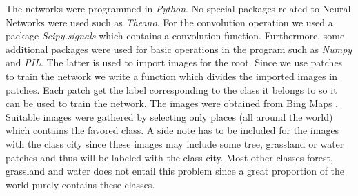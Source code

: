 \documentclass[a4paper,onecolumn]{report}
\begin{document}
The networks were programmed in \textit{Python}. No special packages related to Neural Networks were used such as \textit{Theano}. For the convolution operation we used a package \textit{Scipy.signals} which contains a convolution function. Furthermore, some additional packages were used for basic operations in the program such as \textit{Numpy} and \textit{PIL}. The latter is used to import images for the root. Since we use patches to train the network we write a function which divides the imported images in patches. Each patch get the label corresponding to the class it belongs to so it can be used to train the network. The images were obtained from Bing Maps \cite{bing}. Suitable images were gathered by selecting only places (all around the world) which contains the favored class. A side note has to be included for the images with the class city since these images may include some tree, grassland or water patches and thus will be labeled with the class city. Most other classes forest, grassland and water does not entail this problem since a great proportion of the world purely contains these classes.
\end{document}
